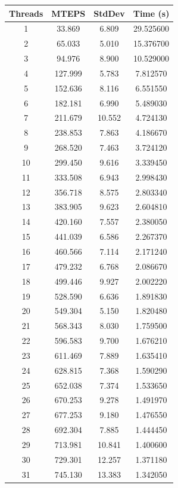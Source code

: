 \documentclass[10pt,twocolumn,letterpaper]{article}
\begin{document}
\begin{table}[h]
\renewcommand\arraystretch{0.8}
\centering
\begin{tabular}{@{}c|ccc@{}}
\toprule
Threads          & MTEPS  & StdDev     & Time (s)      \\ \midrule
1 & 33.869 & 6.809 & 29.525600 \\
2 & 65.033 & 5.010 & 15.376700 \\
3 & 94.976 & 8.900 & 10.529000 \\
4 & 127.999 & 5.783 & 7.812570 \\
5 & 152.636 & 8.116 & 6.551550 \\
6 & 182.181 & 6.990 & 5.489030 \\
7 & 211.679 & 10.552 & 4.724130 \\
8 & 238.853 & 7.863 & 4.186670 \\
9 & 268.520 & 7.463 & 3.724120 \\
10 & 299.450 & 9.616 & 3.339450 \\
11 & 333.508 & 6.943 & 2.998430 \\
12 & 356.718 & 8.575 & 2.803340 \\
13 & 383.905 & 9.623 & 2.604810 \\
14 & 420.160 & 7.557 & 2.380050 \\
15 & 441.039 & 6.586 & 2.267370 \\
16 & 460.566 & 7.114 & 2.171240 \\
17 & 479.232 & 6.768 & 2.086670 \\
18 & 499.446 & 9.927 & 2.002220 \\
19 & 528.590 & 6.636 & 1.891830 \\
20 & 549.304 & 5.150 & 1.820480 \\
21 & 568.343 & 8.030 & 1.759500 \\
22 & 596.583 & 9.700 & 1.676210 \\
23 & 611.469 & 7.889 & 1.635410 \\
24 & 628.815 & 7.368 & 1.590290 \\
25 & 652.038 & 7.374 & 1.533650 \\
26 & 670.253 & 9.278 & 1.491970 \\
27 & 677.253 & 9.180 & 1.476550 \\
28 & 692.304 & 7.885 & 1.444450 \\
29 & 713.981 & 10.841 & 1.400600 \\
30 & 729.301 & 12.257 & 1.371180 \\
31 & 745.130 & 13.383 & 1.342050 \\

\end{tabular}
\end{table}
\end{document}
